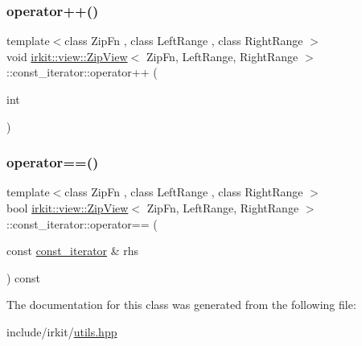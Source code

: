\subsubsection{\texorpdfstring{operator++()}{operator++()}\hspace{0.1cm}{\footnotesize\ttfamily [2/2]}}
{\footnotesize\ttfamily template$<$class Zip\+Fn , class Left\+Range , class Right\+Range $>$ \\
void \mbox{\hyperlink{classirkit_1_1view_1_1ZipView}{irkit\+::view\+::\+Zip\+View}}$<$ Zip\+Fn, Left\+Range, Right\+Range $>$\+::const\+\_\+iterator\+::operator++ (\begin{DoxyParamCaption}\item[{int}]{ }\end{DoxyParamCaption})\hspace{0.3cm}{\ttfamily [inline]}}

\mbox{\label{classirkit_1_1view_1_1ZipView_1_1const__iterator_a7cd1982ce6b7a658c69eca8ec3b211c1}} 
\subsubsection{\texorpdfstring{operator==()}{operator==()}}
{\footnotesize\ttfamily template$<$class Zip\+Fn , class Left\+Range , class Right\+Range $>$ \\
bool \mbox{\hyperlink{classirkit_1_1view_1_1ZipView}{irkit\+::view\+::\+Zip\+View}}$<$ Zip\+Fn, Left\+Range, Right\+Range $>$\+::const\+\_\+iterator\+::operator== (\begin{DoxyParamCaption}\item[{const \mbox{\hyperlink{classirkit_1_1view_1_1ZipView_1_1const__iterator}{const\+\_\+iterator}} \&}]{rhs }\end{DoxyParamCaption}) const\hspace{0.3cm}{\ttfamily [inline]}}



The documentation for this class was generated from the following file\+:\begin{DoxyCompactItemize}
\item 
include/irkit/\mbox{\hyperlink{utils_8hpp}{utils.\+hpp}}\end{DoxyCompactItemize}
